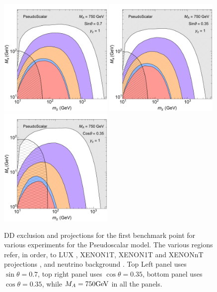 \begin{figure}[ht]
\begin{center}
\includegraphics[width=0.49\textwidth]{texinputs/06_comparisons/figures/PseudoS07.pdf}
\includegraphics[width=0.49\textwidth]{texinputs/06_comparisons/figures/PseudoS035.pdf}\\
\includegraphics[width=0.49\textwidth]{texinputs/06_comparisons/figures/PseudoC035.pdf}
\caption{DD exclusion and projections for the first benchmark point for various experiments for the Pseudoscalar model. The various regions refer, in order, to LUX \citep{Akerib:2016vxi}, XENON1T\citep{Aprile:2017iyp}, XENON1T and XENONnT projections \citep{Aprile:2015uzo}, and neutrino background \citep{Billard:2013qya}. Top Left panel uses $\sin\theta=0.7$, top right panel uses $\cos\theta=0.35$, bottom panel uses $\cos\theta=0.35$, while $M_A=750\textrm{GeV}$ in all the panels.} 
\label{fig:PSDD}
\end{center}
\end{figure} 


